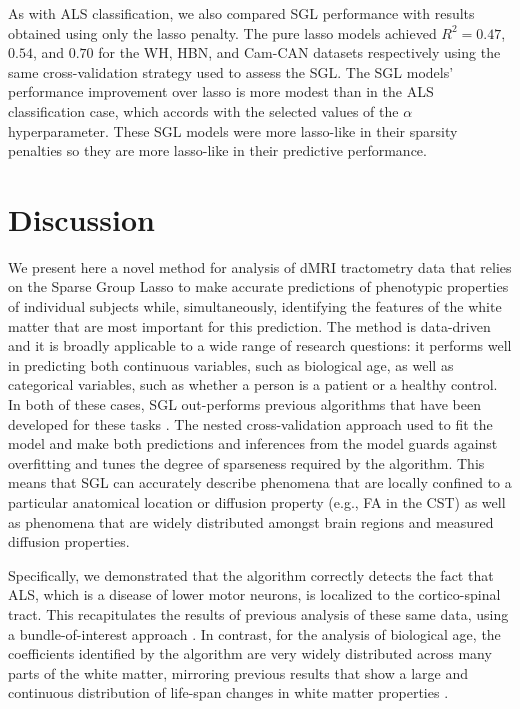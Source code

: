 \documentclass[10pt,letterpaper]{article}
\begin{document}
As with ALS classification, we also compared SGL performance with results
obtained using only the lasso penalty. The pure lasso models achieved $R^2 =
0.47$, $0.54$, and $0.70$ for the WH, HBN, and Cam-CAN datasets respectively
using the same cross-validation strategy used to assess the SGL. The SGL
models' performance improvement over lasso is more modest than in the ALS
classification case, which accords with the selected values of the $\alpha$
hyperparameter. These SGL models were more lasso-like in their sparsity
penalties so they are more lasso-like in their predictive performance.

\section*{Discussion}

We present here a novel method for analysis of dMRI tractometry data that
relies on the Sparse Group Lasso \cite{simon2013sparse} to make accurate
predictions of phenotypic properties of individual subjects while,
simultaneously, identifying the features of the white matter that are most
important for this prediction. The method is data-driven and it is broadly
applicable to a wide range of research questions: it performs well in
predicting both continuous variables, such as biological age, as well as
categorical variables, such as whether a person is a patient or a healthy
control. In both of these cases, SGL out-performs previous algorithms that
have been developed for these tasks \cite{sarica2017corticospinal,
Richard2018-ux, mcpherson2020single}. The nested cross-validation approach
used to fit the model and make both predictions and inferences from the model
guards against overfitting and tunes the degree of sparseness required by the
algorithm. This means that SGL can accurately describe phenomena that are
locally confined to a particular anatomical location or diffusion property
(e.g., FA in the CST) as well as phenomena that are widely distributed
amongst brain regions and measured diffusion properties.

Specifically, we demonstrated that the algorithm correctly detects the fact
that ALS, which is a disease of lower motor neurons, is localized to the
cortico-spinal tract. This recapitulates the results of previous analysis of
these same data, using a bundle-of-interest approach
\cite{sarica2017corticospinal}. In contrast, for the analysis of biological
age, the coefficients identified by the algorithm are very widely distributed
across many parts of the white matter, mirroring previous results that show a
large and continuous distribution of life-span changes in white matter
properties \cite{yeatman2014lifespan}.
\end{document}
